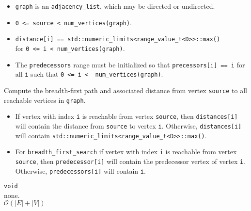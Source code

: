 \begin{itemdescr}
      \pnum\mandates
            \begin{itemize}
                  \item
                        \lstinline{graph} is an \lstinline{adjacency_list}, which may be directed or undirected.
            \end{itemize}
      \pnum\preconditions
            \begin{itemize}
                  \item
                        \lstinline{0 <= source < num_vertices(graph)}.

                  \item
                        \lstinline{distance[i] == std::numeric_limits<range_value_t<D>>::max()} \\
                        for \lstinline{0 <= i < num_vertices(graph)}.  
                  \item
                        The \lstinline{predecessors} range must be initialized so that
                        \lstinline{precessors[i] == i} for all \lstinline{i} such that
                        \lstinline{0 <= i <  num_vertices(graph)}.
            \end{itemize}
      \pnum\effects Compute the breadth-first path and associated distance from vertex
                        \lstinline{source} to all reachable vertices in \lstinline{graph}.
      \pnum\result 
            \begin{itemize}
                  \item If vertex with index \lstinline{i} is reachable from vertex \lstinline{source}, then
                        \lstinline{distances[i]} will contain the distance from \lstinline{source} to vertex
                        \lstinline{i}.  Otherwise, \lstinline{distances[i]} will contain
                        \lstinline{std::numeric_limits<range_value_t<D>>::max()}.
                  \item
                        For \lstinline{breadth_first_search} if vertex with index \lstinline{i} is reachable
                        from vertex \lstinline{source}, then \lstinline{predecessor[i]} will contain the
                        predecessor vertex of vertex \lstinline{i}.  Otherwise, \lstinline{predecessors[i]} 
                        will contain \lstinline{i}.
            \end{itemize}
      \pnum\returns \lstinline{void} \\
      \pnum\throws none.  \\
      \pnum\complexity $\mathcal{O}(|E| + |V|)$ \\
      \pnum\remarks \\
\end{itemdescr}


